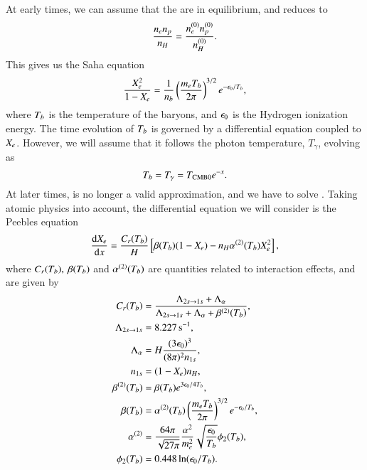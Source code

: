 At early times, we can assume that the  are in equilibrium, and  reduces to 
\begin{equation} \label{eq:M2:theory:Boltzmann_equation_recombination_approximation}
    \frac{n_e n_p}{n_H} = \frac{\equilibriumn[e]\equilibriumn[p]}{\equilibriumn[H]}.
\end{equation}
This gives us the Saha equation 
\begin{equation} \label{eq:M2:theory:saha_equation}
    \frac{\Xe^2}{1-\Xe} = \frac{1}{n_b} \pclosed{\frac{m_e \Tb}{2\pi}}^{3/2} e^{-\epsn / \Tb},
\end{equation}
where $\Tb$ is the temperature of the baryons, and $\epsn$ is the Hydrogen ionization energy. The time evolution of $\Tb$ is governed by a differential equation coupled to $\Xe$. However, we will assume that it follows the photon temperature, $T_\gamma$, evolving as  
\begin{equation} \label{eq:M2:theory:baryon_temperature_evolution}
    \Tb = T_\gamma = \tcmb e^{-x}.
\end{equation}
At later times,  is no longer a valid approximation, and we have to solve . Taking atomic physics into account, the differential equation we will consider is the Peebles equation  
\begin{equation} \label{eq:M2:theory:Xe_peebles_ODE}
    \dv{\Xe}{x} = \frac{C_r(\Tb)}{H}\bclosed{\beta(\Tb)(1-\Xe) - n_H \alpha^{(2)}(\Tb) \Xe^2 },
\end{equation}
where $C_r(\Tb),\: \beta(\Tb)$ and $\alpha^{(2)}(\Tb)$ are quantities related to interaction effects, and are given by 
\begin{subequations} \label{eq:M2:theory:peebles:ODE_all_individual_terms}
    \begin{align}
        C_r(\Tb) &= \frac{\Lambda_{2s\to1s} + \Lambda_\alpha}{\Lambda_{2s\to1s} + \Lambda_\alpha + \beta^{(2)}(\Tb)}, \label{eq:M2:theory:peebles:C_r} \\
        \Lambda_{2s\to1s} &= 8.227\unit{s^{-1}}, \label{eq:M2:theory:peebles:Lambda_2s_1s} \\
        \Lambda_\alpha &= H \frac{(3\epsn)^3}{(8\pi)^2 n_{1s}}, \label{eq:M2:theory:peebles:Lambda_alpha} \\
        n_{1s} &= (1-\Xe) n_H , \label{eq:M2:theory:peebles:n_1s} \\
        \beta^{(2)}(\Tb) &= \beta(\Tb) e^{3\epsn/4\Tb}, \label{eq:M2:theory:peebles:beta2} \\
        \beta(\Tb) &= \alpha^{(2)}(\Tb) \pclosed{\frac{m_e \Tb}{2\pi}}^{3/2} e^{-\epsn/\Tb}, \label{eq:M2:theory:peebles:beta} \\
        \alpha^{(2)} &= \frac{64\pi}{\sqrt{27\pi}} \frac{\alpha^2}{m_e^2} \sqrt{\frac{\epsn}{\Tb}} \phi_2(\Tb), \label{eq:M2:theory:peebles:alpha_2} \\
        \phi_2(\Tb) &= 0.448\ln(\epsn/\Tb). \label{eq:M2:theory:peebles:phi_2} 
    \end{align}
\end{subequations}
